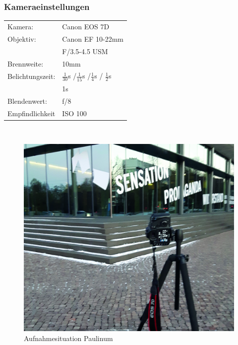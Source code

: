 \documentclass[liststotoc,bibtotoc,fontsize=14pt,]{scrreprt}
\begin{document}
		\subsubsection{Kameraeinstellungen}
			\begin{minipage}{0.58\textwidth}
				\begin{tabular}{ll}
					Kamera: &Canon EOS 7D \\
					Objektiv: &Canon EF 10-22mm \\
					& F/3.5-4.5 USM\\		
					Brennweite:& 10mm \\
					Belichtungszeit: & $\frac{1}{30}$s /$\frac{1}{15}$s /$\frac{1}{4}$s / $\frac{1}{2}$s \\
					 & 1s\\
					Blendenwert: & f/8\\
					Empfindlichkeit & ISO 100 \\
				\end{tabular}\\
			\end{minipage}%
			\begin{minipage}{0.42\textwidth}
				\begin{figure}[H]
					\includegraphics[width=\linewidth]{img/places/bibo.jpg}
					\caption{Aufnahmesituation Paulinum}
					\label{img:ak}
				\end{figure}
			\end{minipage}%
\end{document}
